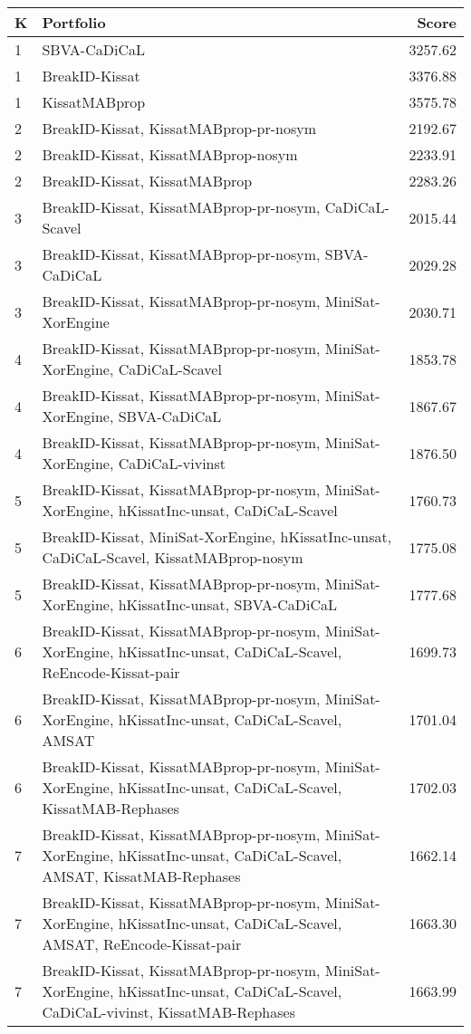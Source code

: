 \begin{tabular}{l|p{.9\linewidth}r}
\toprule
K & Portfolio & Score \\
\midrule
1 & SBVA-CaDiCaL & 3257.62 \\
1 & BreakID-Kissat & 3376.88 \\
1 & KissatMABprop & 3575.78 \\
2 & BreakID-Kissat, KissatMABprop-pr-nosym & 2192.67 \\
2 & BreakID-Kissat, KissatMABprop-nosym & 2233.91 \\
2 & BreakID-Kissat, KissatMABprop & 2283.26 \\
3 & BreakID-Kissat, KissatMABprop-pr-nosym, CaDiCaL-Scavel & 2015.44 \\
3 & BreakID-Kissat, KissatMABprop-pr-nosym, SBVA-CaDiCaL & 2029.28 \\
3 & BreakID-Kissat, KissatMABprop-pr-nosym, MiniSat-XorEngine & 2030.71 \\
4 & BreakID-Kissat, KissatMABprop-pr-nosym, MiniSat-XorEngine, CaDiCaL-Scavel & 1853.78 \\
4 & BreakID-Kissat, KissatMABprop-pr-nosym, MiniSat-XorEngine, SBVA-CaDiCaL & 1867.67 \\
4 & BreakID-Kissat, KissatMABprop-pr-nosym, MiniSat-XorEngine, CaDiCaL-vivinst & 1876.50 \\
5 & BreakID-Kissat, KissatMABprop-pr-nosym, MiniSat-XorEngine, hKissatInc-unsat, CaDiCaL-Scavel & 1760.73 \\
5 & BreakID-Kissat, MiniSat-XorEngine, hKissatInc-unsat, CaDiCaL-Scavel, KissatMABprop-nosym & 1775.08 \\
5 & BreakID-Kissat, KissatMABprop-pr-nosym, MiniSat-XorEngine, hKissatInc-unsat, SBVA-CaDiCaL & 1777.68 \\
6 & BreakID-Kissat, KissatMABprop-pr-nosym, MiniSat-XorEngine, hKissatInc-unsat, CaDiCaL-Scavel, ReEncode-Kissat-pair & 1699.73 \\
6 & BreakID-Kissat, KissatMABprop-pr-nosym, MiniSat-XorEngine, hKissatInc-unsat, CaDiCaL-Scavel, AMSAT & 1701.04 \\
6 & BreakID-Kissat, KissatMABprop-pr-nosym, MiniSat-XorEngine, hKissatInc-unsat, CaDiCaL-Scavel, KissatMAB-Rephases & 1702.03 \\
7 & BreakID-Kissat, KissatMABprop-pr-nosym, MiniSat-XorEngine, hKissatInc-unsat, CaDiCaL-Scavel, AMSAT, KissatMAB-Rephases & 1662.14 \\
7 & BreakID-Kissat, KissatMABprop-pr-nosym, MiniSat-XorEngine, hKissatInc-unsat, CaDiCaL-Scavel, AMSAT, ReEncode-Kissat-pair & 1663.30 \\
7 & BreakID-Kissat, KissatMABprop-pr-nosym, MiniSat-XorEngine, hKissatInc-unsat, CaDiCaL-Scavel, CaDiCaL-vivinst, KissatMAB-Rephases & 1663.99 \\
\bottomrule
\end{tabular}
